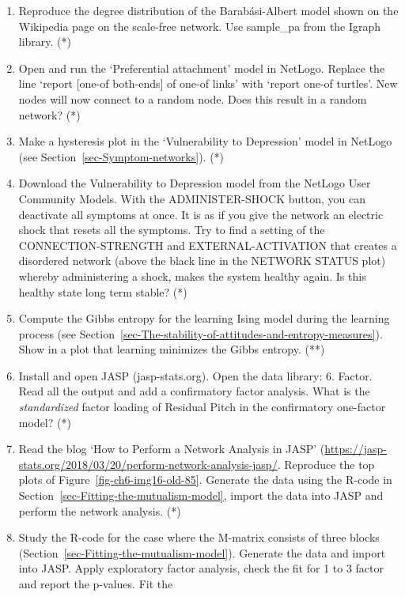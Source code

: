 \documentclass[
  a4paper,
  DIV=11,
  numbers=noendperiod,
  oneside]{scrreprt}
\begin{document}
\begin{enumerate}
\def\labelenumi{\arabic{enumi})}
\item
  Reproduce the degree distribution of the Barabási-Albert model shown
  on the Wikipedia page on the scale-free network. Use sample\_pa from
  the Igraph library. (*)
\item
  Open and run the `Preferential attachment' model in NetLogo. Replace
  the line `report {[}one-of both-ends{]} of one-of links' with `report
  one-of turtles'. New nodes will now connect to a random node. Does
  this result in a random network? (*)
\item
  Make a hysteresis plot in the `Vulnerability to Depression' model in
  NetLogo (see Section~\ref{sec-Symptom-networks}). (*)
\item
  Download the Vulnerability to Depression model from the NetLogo User
  Community Models. With the ADMINISTER-SHOCK button, you can deactivate
  all symptoms at once. It is as if you give the network an electric
  shock that resets all the symptoms. Try to find a setting of the
  CONNECTION-STRENGTH and EXTERNAL-ACTIVATION that creates a disordered
  network (above the black line in the NETWORK STATUS plot) whereby
  administering a shock, makes the system healthy again. Is this healthy
  state long term stable? (*)
\item
  Compute the Gibbs entropy for the learning Ising model during the
  learning process (see
  Section~\ref{sec-The-stability-of-attitudes-and-entropy-measures}).
  Show in a plot that learning minimizes the Gibbs entropy. (**)
\item
  Install and open JASP (jasp-stats.org). Open the data library: 6.
  Factor. Read all the output and add a confirmatory factor analysis.
  What is the \emph{standardized} factor loading of Residual Pitch in
  the confirmatory one-factor model? (*)
\item
  Read the blog `How to Perform a Network Analysis in JASP'
  (\url{https://jasp-stats.org/2018/03/20/perform-network-analysis-jasp/}.
  Reproduce the top plots of Figure~\ref{fig-ch6-img16-old-85}. Generate
  the data using the R-code in
  Section~\ref{sec-Fitting-the-mutualism-model}, import the data into
  JASP and perform the network analysis. (*)
\item
  Study the R-code for the case where the M-matrix consists of three
  blocks (Section~\ref{sec-Fitting-the-mutualism-model}). Generate the
  data and import into JASP. Apply exploratory factor analysis, check
  the fit for 1 to 3 factor and report the p-values. Fit the

\end{enumerate}
\end{document}
